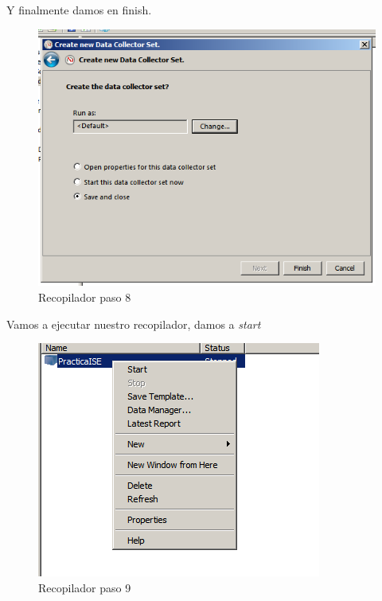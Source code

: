Y finalmente damos en finish.

\begin{figure}[H] %
	\centering
	\includegraphics[scale=0.5]{pics/recopilador8.png}  %
	\caption{Recopilador paso 8} \label{fig:reco8}
\end{figure}

Vamos a ejecutar nuestro recopilador, damos a \textit{start}
\begin{figure}[H] %
	\centering
	\includegraphics[scale=0.5]{pics/recopilador9.png}  %
	\caption{Recopilador paso 9} \label{fig:reco9}
\end{figure}

